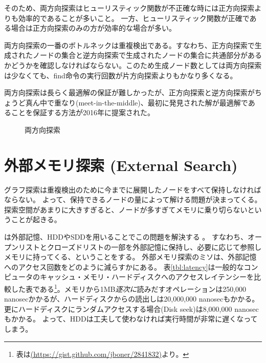 そのため、両方向探索はヒューリスティック関数が不正確な時には正方向探索よりも効率的であることが多いこと\cite{barker2015limitations}。
一方、ヒューリスティック関数が正確である場合は正方向探索のみの方が効率的な場合が多い。

両方向探索の一番のボトルネックは重複検出である。すなわち、正方向探索で生成されたノードの集合と逆方向探索で生成されたノードの集合に共通部分があるかどうかを確認しなければならない。このため生成ノード数としては両方向探索は少なくても、find命令の実行回数が片方向探索よりもかなり多くなる。

両方向探索は長らく最適解の保証が難しかったが、正方向探索と逆方向探索がちょうど真ん中で重なり(meet-in-the-middle)、最初に発見された解が最適解であることを保証する方法が2016年に提案された\cite{holte2016bidirectional}。

\begin{figure}
  \centering
  \scalebox{0.75}{
  \begin{tikzpicture}[scale=0.6]
    
  \end{tikzpicture}
  }
  \caption{両方向探索}
  \label{fig:bidirectional}
\end{figure}



\section{外部メモリ探索 (External Search)}
\label{sec:external-search}


グラフ探索は重複検出のために今までに展開したノードをすべて保持しなければならない。
よって、保持できるノードの量によって解ける問題が決まってくる。
探索空間があまりに大きすぎると、ノードが多すぎてメモリに乗り切らないということが起きる。

は外部記憶、HDDやSDDを用いることでこの問題を解決する \cite{chiang1995external}。
すなわち、オープンリストとクローズドリストの一部を外部記憶に保持し、必要に応じて参照しメモリに持ってくる、ということをする。
外部メモリ探索のミソは、外部記憶へのアクセス回数をどのように減らすかにある。
表\ref{tbl:latency}は一般的なコンピュータのキャッシュ・メモリ・ハードディスクへのアクセスレイテンシーを比較した表である\footnote{表は\url{(https://gist.github.com/jboner/2841832)}より。}。メモリから1MB{\it 逐次に}読みだすオペレーションは250,000 nanosecかかるが、ハードディスクからの読出しは20,000,000 nanosecもかかる。更にハードディスクにランダムアクセスする場合(Disk seek)は8,000,000 nanosecもかかる。
よって、HDDは工夫して使わなければ実行時間が非常に遅くなってしまう。%

